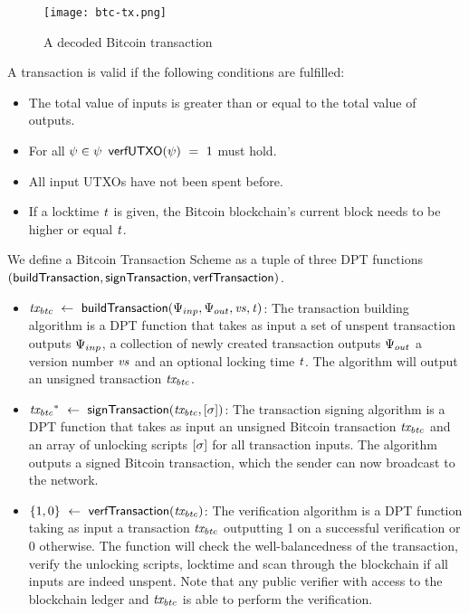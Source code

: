 \begin{figure}
    \begin{center}
        \texttt{[image: btc-tx.png]}
    \end{center}
    \caption{A decoded Bitcoin transaction} \label{fig:btc-tx}
\end{figure}

A transaction is valid if the following conditions are fulfilled:

\begin{itemize}
    \item The total value of inputs is greater than or equal to the total value of outputs.
    \item For all $\psi \in \psi$ $\mathsf{verfUTXO}(\psi) ~=~ 1$ must hold.
    \item All input UTXOs have not been spent before.
    \item If a locktime $\mathit{t}$ is given, the Bitcoin blockchain's current block needs to be higher or equal $\mathit{t}$.
\end{itemize}

\begin{definition}
    We define a Bitcoin Transaction Scheme as a tuple of three DPT functions $(\mathsf{buildTransaction},
    \mathsf{signTransaction}, \mathsf{verfTransaction})$.
    \begin{itemize}
        \item $\mathit{tx_{btc}} ~\leftarrow~ \mathsf{buildTransaction}(\Psi_{inp},\Psi_{out},\mathit{vs},\mathit{t})$: The transaction building algorithm is a DPT function that takes as input a set of unspent transaction outputs $\Psi_{inp}$, a collection of newly created transaction outputs $\Psi_{out}$ a version number $\mathit{vs}$ and an optional locking time $\mathit{t}$.
        The algorithm will output an unsigned transaction $\mathit{tx_{btc}}$.
        \item $\mathit{tx_{btc}}^* ~\leftarrow~ \mathsf{signTransaction} (\mathit{tx_{btc}},[\mathit{\sigma}])$: The transaction
        signing algorithm is a DPT function that takes as input an unsigned Bitcoin transaction $\mathit{tx_{btc}}$ and an array
        of unlocking scripts $[\mathit{\sigma}]$ for all transaction inputs.
        The algorithm outputs a signed Bitcoin transaction, which the sender can now broadcast to the network.
        \item $\{ 1,0 \} ~\leftarrow~ \mathsf{verfTransaction}(\mathit{tx_{btc}})$: The verification algorithm is a DPT function taking as input a transaction $\mathit{tx_{btc}}$ outputting 1 on a successful verification or 0 otherwise.
        The function will check the well-balancedness of the transaction, verify the unlocking scripts, locktime and scan through the blockchain if all inputs are indeed unspent.
        Note that any public verifier with access to the blockchain ledger and $\mathit{tx_{btc}}$ is able to perform the verification.
    \end{itemize}
\end{definition}

